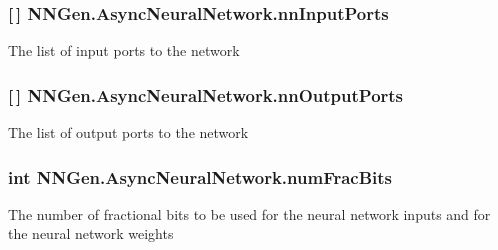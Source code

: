 \subsubsection[{nn\+Input\+Ports}]{ \mbox{[}$\,$\mbox{]} N\+N\+Gen.\+Async\+Neural\+Network.\+nn\+Input\+Ports\hspace{0.3cm}{\ttfamily [get]}}\label{class_n_n_gen_1_1_async_neural_network_a6422fde806a9cf2188ca93c5166ebb23}


The list of input ports to the network 

\hypertarget{class_n_n_gen_1_1_async_neural_network_a666078677fa5db12619f912ca472bdee}{}
\subsubsection[{nn\+Output\+Ports}]{ \mbox{[}$\,$\mbox{]} N\+N\+Gen.\+Async\+Neural\+Network.\+nn\+Output\+Ports\hspace{0.3cm}{\ttfamily [get]}}\label{class_n_n_gen_1_1_async_neural_network_a666078677fa5db12619f912ca472bdee}


The list of output ports to the network 

\hypertarget{class_n_n_gen_1_1_async_neural_network_a195b5331d3ed6f5babecb6e7e6b22cb7}{}
\subsubsection[{num\+Frac\+Bits}]{\setlength{\rightskip}{0pt plus 5cm}int N\+N\+Gen.\+Async\+Neural\+Network.\+num\+Frac\+Bits\hspace{0.3cm}{\ttfamily [get]}}\label{class_n_n_gen_1_1_async_neural_network_a195b5331d3ed6f5babecb6e7e6b22cb7}


The number of fractional bits to be used for the neural network inputs and for the neural network weights 

\hypertarget{class_n_n_gen_1_1_async_neural_network_aa792285911d8e4b6d402451efe7d57c2}{}
